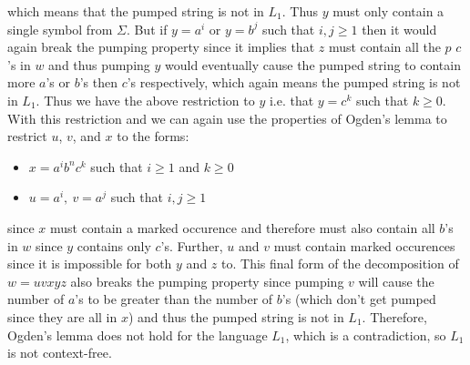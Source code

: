 \documentclass[12pt]{article}
\begin{document}
which means that the pumped string is not in $L_1$. Thus $y$ must only contain
a single symbol from $\Sigma$. But if $y=a^i$ or $y=b^j$ such that $i,j\ge 1$
then it would again break the pumping property since it implies that $z$ must
contain all the $p$ $c$'s in $w$ and thus pumping $y$ would eventually cause
the pumped string to contain more $a$'s or $b$'s then $c$'s respectively,
which again means the pumped string is not in $L_1$. Thus we have the above
restriction to $y$ i.e. that $y=c^k$ such that $k\ge 0$. With this restriction
and we can again use the properties of Ogden's lemma to restrict $u$, $v$, and
$x$ to the forms:
\begin{itemize}
\item $x=a^ib^nc^k$ such that $i\ge 1$ and $k\ge 0$
\item $u=a^i,\ v=a^j$ such that $i,j\ge 1$
\end{itemize}
since $x$ must contain a marked occurence and therefore must also contain all
$b$'s in $w$ since $y$ contains only $c$'s. Further, $u$ and $v$ must contain
marked occurences since it is impossible for both $y$ and $z$ to. This final
form of the decomposition of $w=uvxyz$ also breaks the pumping property since
pumping $v$ will cause the number of $a$'s to be greater than the number of
$b$'s (which don't get pumped since they are all in $x$) and thus the pumped
string is not in $L_1$. Therefore, Ogden's lemma does not hold for the language
$L_1$, which is a contradiction, so $L_1$ is not context-free.
\end{document}
